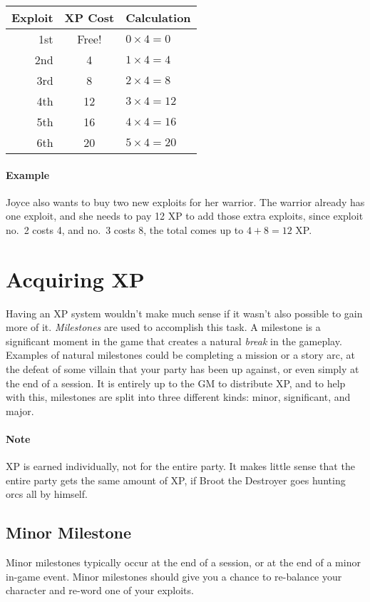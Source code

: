 \begin{center}
  \begin{tabular}{r|c|l}
    \textbf{Exploit} & \textbf{XP Cost} & \textbf{Calculation}\\\hline
    1st & Free! & $0 \times 4 = 0$ \\
    2nd & 4     & $1 \times 4 = 4$ \\
    3rd & 8     & $2 \times 4 = 8$ \\
    4th & 12    & $3 \times 4 = 12$\\
    5th & 16    & $4 \times 4 = 16$\\
    6th & 20    & $5 \times 4 = 20$\\
  \end{tabular}
\end{center}

\paragraph{Example} Joyce also wants to buy two new exploits for her warrior.
The warrior already has one exploit, and she needs to pay 12 XP to add those extra exploits, since exploit no.\ 2 costs 4, and no.\ 3 costs 8, the total comes up to $4 + 8 = 12$ XP.

\section{Acquiring XP}
Having an XP system wouldn't make much sense if it wasn't also possible to gain more of it.
\textit{Milestones} are used to accomplish this task.
A milestone is a significant moment in the game that creates a natural \textit{break} in the gameplay.
Examples of natural milestones could be completing a mission or a story arc, at the defeat of some villain that your party has been up against, or even simply at the end of a session.
It is entirely up to the GM to distribute XP, and to help with this, milestones are split into three different kinds: minor, significant, and major.

\paragraph{Note} XP is earned individually, not for the entire party.
It makes little sense that the entire party gets the same amount of XP, if Broot the Destroyer goes hunting orcs all by himself.

\subsection{Minor Milestone}
Minor milestones typically occur at the end of a session, or at the end of a minor in-game event.
Minor milestones should give you a chance to re-balance your character and re-word one of your exploits.

